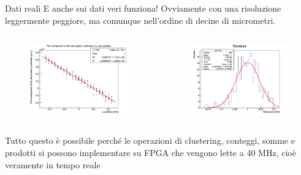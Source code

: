 \documentclass[
10pt,
aspectratio=169,
]{beamer}
\begin{document}
\begin{frame}{Dati reali}
E anche sui dati veri funziona! Ovviamente con una risoluzione leggermente peggiore, ma comunque nell'ordine di decine di micrometri.
        \begin{columns}
        \begin{figure}
            \centering
            \includegraphics[width=\textwidth]{y_fit_dati.png}
        \end{figure}
        \begin{figure}
            \centering
            \includegraphics[width=\textwidth]{y_res_dati.png}
        \end{figure}
    \end{columns}
    Tutto questo è possibile perché le operazioni di clustering, conteggi, somme e prodotti si possono implementare su FPGA che vengono lette a 40 MHz, cioè veramente in tempo reale
\end{frame}
\end{document}
